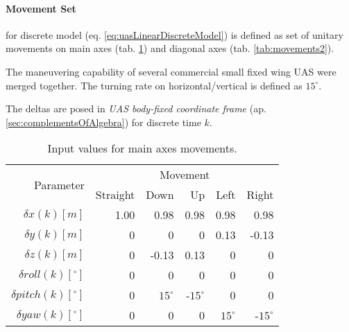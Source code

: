 \paragraph{Movement Set} for discrete model (eq. \ref{eq:uasLinearDiscreteModel}) is defined as set of unitary movements on main axes (tab. \ref{tab:movements1}) and diagonal axes (tab. \ref{tab:movements2}). 

The maneuvering capability of several commercial small fixed wing UAS were merged together. The turning rate on horizontal/vertical is defined as $15^\circ$.

The deltas are posed in \emph{UAS body-fixed coordinate frame} (ap. \ref{sec:complementsOfAlgebra}) for discrete time $k$. 

\begin{table}[H]
    \centering
    \begin{tabular}{r||r|r|r|r|r}
    	\multirow{2}{*}{Parameter} & \multicolumn{5}{c}{Movement} \\\cline{2-6} 
                &    Straight  & Down & Up & Left  & Right   \\\hline\hline
        $\delta     x(k)[m]$           &    1.00	  & 0.98  & 0.98  & 0.98 & 0.98  \\\hline
        $\delta     y(k)[m]$           &    0	      & 0	  & 0	  & 0.13 & -0.13 \\\hline
        $\delta     z(k)[m]$           &    0	      & -0.13 & 0.13  &	0	 & 0     \\\hline
        $\delta  roll(k) [^\circ]$	   &    0	      & 0	  & 0	  & 0    & 0     \\\hline
        $\delta pitch(k) [^\circ]$     &    0	      & $15^\circ$  & -$15^\circ$ & 0	 & 0     \\\hline
        $\delta   yaw(k) [^\circ]$     &    0	      & 0	  & 0	  & $15^\circ$ & -$15^\circ$ \\
    \end{tabular}
    \caption{Input values for main axes movements.}
    \label{tab:movements1}
\end{table}
